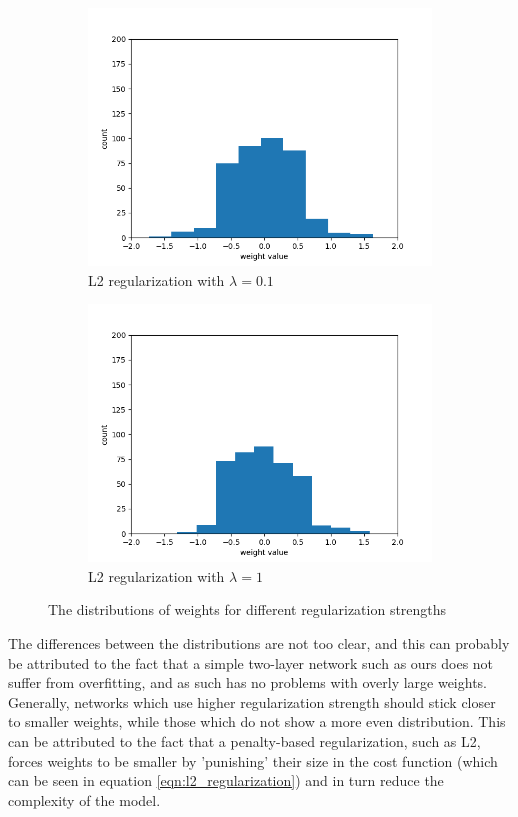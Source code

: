\documentclass[a4paper]{article}
\begin{document}
\begin{figure}[h!]
\begin{subfigure}[b]{0.475\textwidth}
		\centering 
		\includegraphics[width=\textwidth]{images/weight_histogram_0_1.png}
		\caption[]%
		{{\small L2 regularization with $\lambda = 0.1$}}    
	\end{subfigure}
	\begin{subfigure}[b]{0.475\textwidth}   
		\centering 
		\includegraphics[width=\textwidth]{images/weight_histogram_1.png}
		\caption[]%
		{{\small L2 regularization with $\lambda = 1$}}    
	\end{subfigure}
	\caption{The distributions of weights for different regularization strengths} 
	\label{fig:weight_histograms}
\end{figure}

The differences between the distributions are not too clear, and this can probably be attributed to the fact that a simple two-layer network such as ours does not suffer from overfitting, and as such has no problems with overly large weights. Generally, networks which use higher regularization strength should stick closer to smaller weights, while those which do not show a more even distribution. This can be attributed to the fact that a penalty-based regularization, such as L2, forces weights to be smaller by 'punishing' their size in the cost function (which can be seen in equation \ref{eqn:l2_regularization}) and in turn reduce the complexity of the model.
\end{document}
